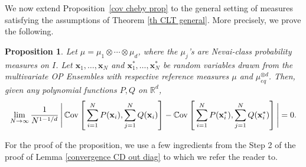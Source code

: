 \documentclass[a4paper,11pt]{article}
\numberwithin{equation}{section}
\newtheorem{proposition}[]{Proposition}
\theoremstyle{definition}
\newcommand{\eq}{\begin{equation}}
\newcommand{\qe}{\end{equation}}
\newcommand{\N}{\mathbb{N}}
\newcommand{\R}{\mathbb{R}}
\newcommand{\bs}{\boldsymbol}
\newcommand{\bv}{\mathbf}
\newcommand{\mueqd}{\mu_{eq}^{\otimes d}}
\renewcommand{\phi}{\varphi}
\begin{document}
We now extend Proposition~\ref{cov cheby prop} to the general setting of
measures satisfying the assumptions of Theorem \ref{th CLT general}. More
precisely, we prove the following.

\begin{proposition}
\label{general cov}
Let $\mu=\mu_1\otimes\cdots\otimes\mu_d$, where the $\mu_j$'s are Nevai-class
probability measures on $I$. Let $\bv x_1,\ldots, \bv x_N$ and $\bv
x_1^*,\ldots, \bv x_N^*$ be random
variables drawn from the multivariate OP Ensembles with respective reference
measures $\mu$ and $\mueqd$. Then, given any polynomial functions $P,Q$ on $\R^d$,
\eq
 \lim_{N\rightarrow\infty}\frac{1}{N^{1-1/d}}\,\Bigg|\,\mathbb C{\rm ov}\left[\,\sum_{i=1}^NP(\bv x_i),\sum_{j=1}^NQ(\bv x_i)\right] -\mathbb C{\rm ov}\left[\,\sum_{i=1}^NP(\bv x_i^*),\sum_{j=1}^NQ(\bv x_i^*)\right]\Bigg|=0.
\qe
\end{proposition}


For the proof of the proposition, we use a few ingredients from the Step 2 of the proof of Lemma \ref{convergence CD out diag} to which we refer the reader to.
\end{document}
